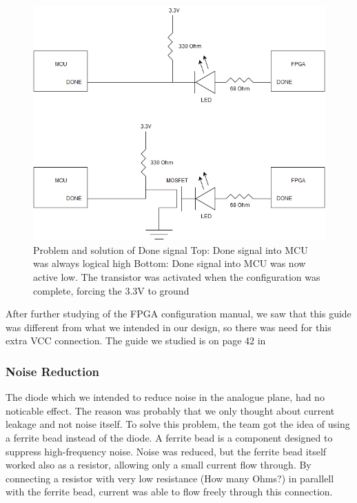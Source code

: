 \begin{figure}[h!]
\centering
\includegraphics[scale=0.5]{images/Done_Signal_Issue.png}
\caption{Problem and solution of Done signal
         \newline
         Top: Done signal into MCU was always logical high
         \newline
         Bottom: Done signal into MCU was now active low. The transistor was activated when the configuration was complete, forcing the 3.3V to ground}
\label{fig:Done Issue}
\end{figure}

After further studying of the FPGA configuration manual, we saw that this guide was different from what we intended in our design, so there was need for this extra VCC connection. The guide we studied is on page 42 in \cite{fpga-configuration}

\subsubsection{Noise Reduction}
The diode which we intended to reduce noise in the analogue plane, had no noticable effect. The reason was probably that we only thought about current leakage and not noise itself. To solve this problem, the team got the idea of using a ferrite bead instead of the diode. A ferrite bead is a component designed to suppress high-frequency noise. 
\newline
Noise was reduced, but the ferrite bead itself worked also as a resistor, allowing only a small current flow through. By connecting a resistor with very low resistance (How many Ohms?) in parallell with the ferrite bead, current was able to flow freely through this connection.
